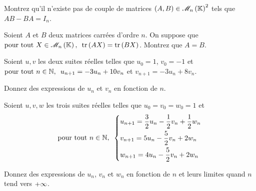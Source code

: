 \begin{corr}
\end{corr}

\begin{exos}[Exercice 24]
Montrez qu'il n'existe pas de couple de matrices \(\paren{A,B}\in\M{n}^2\) tels que \(AB-BA=I_n\).
\end{exos}

\begin{corr}
\end{corr}

\begin{exops}[Exercice 25]
Soient \(A\) et \(B\) deux matrices carrées d'ordre \(n\). On suppose que \(\quantifs{\tpt X\in\M{n}}\tr\paren{AX}=\tr\paren{BX}\). Montrez que \(A=B\).
\end{exops}

\begin{corr}
\end{corr}

\begin{exos}[Exercice 26]
Soient \(u,v\) les deux suites réelles telles que \(u_0=1\), \(v_0=-1\) et \(\quantifs{\tpt n\in\N}u_{n+1}=-3u_n+10v_n\) et \(v_{n+1}=-3u_n+8v_n\).

Donnez des expressions de \(u_n\) et \(v_n\) en fonction de \(n\).
\end{exos}

\begin{corr}
\end{corr}

\begin{exoss}[Exercice 27]
Soient \(u,v,w\) les trois suites réelles telles que \(u_0=v_0=w_0=1\) et \[\quantifs{\tpt n\in\N}\begin{dcases}
u_{n+1}=\dfrac{3}{2}u_n-\dfrac{1}{2}v_n+\dfrac{1}{2}w_n \\
v_{n+1}=5u_n-\dfrac{5}{2}v_n+2w_n \\
w_{n+1}=4u_n-\dfrac{5}{2}v_n+2w_n
\end{dcases}\]

Donnez des expressions de \(u_n\), \(v_n\) et \(w_n\) en fonction de \(n\) et leurs limites quand \(n\) tend vers \(+\infty\).
\end{exoss}

\begin{corr}
\end{corr}

